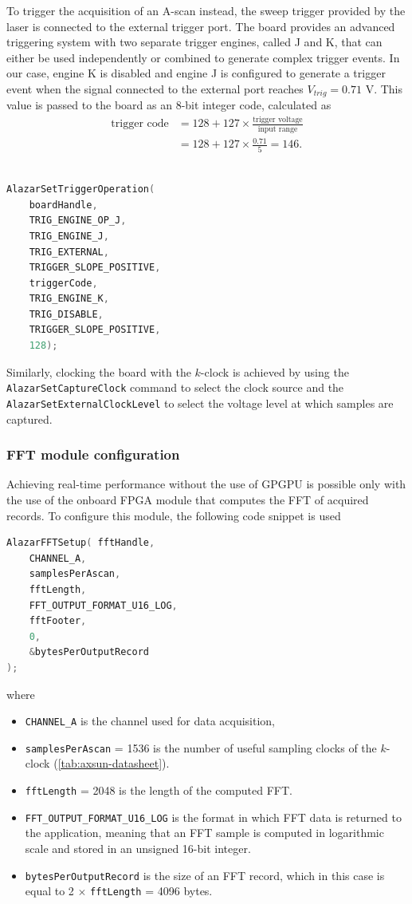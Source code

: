 To trigger the acquisition of an A-scan instead, the sweep trigger provided by the laser is connected to the external trigger port. The board provides an advanced triggering system with two separate trigger engines, called J and K, that can either be used independently or combined to generate complex trigger events. In our case, engine K is disabled and engine J is configured to generate a trigger event when the signal connected to the external port reaches $V_{trig} = 0.71$ V. This value is passed to the board as an 8-bit integer code, calculated as 
\begin{align}
	\text{trigger code} &= 128 + 127 \times \frac{\text{trigger voltage}}{\text{input range}}\\
					&= 128 + 127 \times \frac{0.71}{5} = 146.
\end{align}

\begin{lstlisting}[language=C,frame=tb]

AlazarSetTriggerOperation(
	boardHandle,
	TRIG_ENGINE_OP_J,
	TRIG_ENGINE_J,
	TRIG_EXTERNAL,
	TRIGGER_SLOPE_POSITIVE,
	triggerCode, 
	TRIG_ENGINE_K, 
	TRIG_DISABLE, 
	TRIGGER_SLOPE_POSITIVE,
	128);

\end{lstlisting}

Similarly, clocking the board with the $k$-clock is achieved by using the \texttt{AlazarSetCaptureClock} command to select the clock source and the \texttt{AlazarSetExternalClockLevel} to select the voltage level at which samples are captured.


\subsubsection{FFT module configuration}
Achieving real-time performance without the use of \ac{GPGPU} is possible only with the use of the onboard FPGA module that computes the FFT of acquired records. To configure this module, the following code snippet is used
\begin{lstlisting}[language=C,frame=tb]
AlazarFFTSetup(	fftHandle,
	CHANNEL_A,
	samplesPerAscan,
	fftLength,
	FFT_OUTPUT_FORMAT_U16_LOG,
	fftFooter,
	0,
	&bytesPerOutputRecord
);
\end{lstlisting}
where 

\begin{itemize}
	\item \texttt{CHANNEL\_A} is the channel used for data acquisition,
	\item  \texttt{samplesPerAscan} = 1536 is the number of useful sampling clocks of the $k$-clock (\autoref{tab:axsun-datasheet}).
	\item \texttt{fftLength} = 2048 is the length of the computed FFT.
	\item \texttt{FFT\_OUTPUT\_FORMAT\_U16\_LOG} is the format in which FFT data is returned to the application, meaning that an FFT sample is computed in logarithmic scale and stored in an unsigned 16-bit integer.
	\item \texttt{bytesPerOutputRecord} is the size of an FFT record, which in this case is equal to 2 $\times$ \texttt{fftLength} = 4096 bytes.
\end{itemize}

